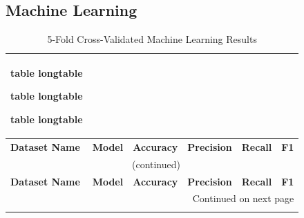 \documentclass[stu,12pt,floatsintext,donotrepeattitle]{apa7}
\makeatletter
\let\origcaption\caption
\newcommand{\@tabletype}{table}
\newcommand{\@longtabletype}{longtable}
\DeclareRobustCommand{\caption}[2][]{%
    \ifx\relax#1\relax
      \origcaption{#2}%
      \def\temp@cap{#2}%
    \else
      \origcaption[#1]{#2}%
      \def\temp@cap{#1}%
    \fi
    \ifx\@captype\@tabletype
      \ifx\@currenvir\@longtabletype\else
        \addcontentsline{lot}{table}{\protect\numberline{\thetable}{\ignorespaces\temp@cap}}%
      \fi
    \fi
  }%
\let\oldcaption\caption
\renewcommand{\caption}[2][]{%
    \oldcaption[#1]{#2}%
    \vspace{-12pt}%
  }%
\makeatother
\begin{document}
\newpage
\subsection{Machine Learning}

\begingroup
\setlength{\tabcolsep}{3pt}
\renewcommand{\arraystretch}{1.3}
\setlength\LTleft{\fill}
\setlength\LTright{\fill}
\begin{longtable}{@{} p{4.7cm} p{3.2cm} p{1.7cm} p{1.7cm} p{1.7cm} p{1.7cm} @{}}
\caption{5-Fold Cross-Validated Machine Learning Results} \label{tab:ml_results} \\
\toprule
\textbf{Dataset Name} & \textbf{Model} & \textbf{Accuracy} & \textbf{Precision} & \textbf{Recall} & \textbf{F1} \\
\midrule
\endfirsthead

\multicolumn{6}{c}{\normalsize\tablename\ \thetable{} (continued)} \\
\toprule
\textbf{Dataset Name} & \textbf{Model} & \textbf{Accuracy} & \textbf{Precision} & \textbf{Recall} & \textbf{F1} \\
\midrule
\endhead

\bottomrule
\multicolumn{6}{r}{{Continued on next page}} \\
\endfoot


\end{longtable}
\end{document}
